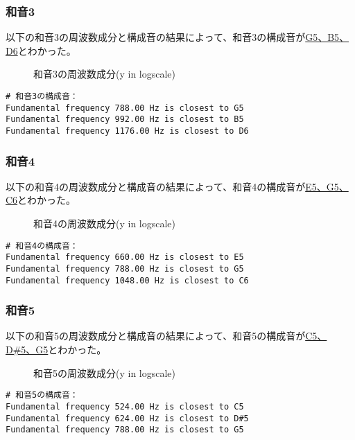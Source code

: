 \documentclass{article}
\begin{document}
\begin{spacing}{1.2}
        \subsubsection*{和音3}
        以下の和音3の周波数成分と構成音の結果によって、和音3の構成音が\underline{G5、B5、D6}とわかった。
        \begin{figure}[ht] %
            \centering
            \caption{和音3の周波数成分(y in logscale)}
        \end{figure}
        \FloatBarrier
        \begin{lstlisting}
# 和音3の構成音：
Fundamental frequency 788.00 Hz is closest to G5
Fundamental frequency 992.00 Hz is closest to B5
Fundamental frequency 1176.00 Hz is closest to D6
        \end{lstlisting}
        \subsubsection*{和音4}
        以下の和音4の周波数成分と構成音の結果によって、和音4の構成音が\underline{E5、G5、C6}とわかった。
        \begin{figure}[ht] %
            \centering
            \caption{和音4の周波数成分(y in logscale)}
        \end{figure}
        \FloatBarrier
        \begin{lstlisting}
# 和音4の構成音：
Fundamental frequency 660.00 Hz is closest to E5
Fundamental frequency 788.00 Hz is closest to G5
Fundamental frequency 1048.00 Hz is closest to C6
        \end{lstlisting}
        \subsubsection*{和音5}
        以下の和音5の周波数成分と構成音の結果によって、和音5の構成音が\underline{C5、D\#5、G5}とわかった。
        \begin{figure}[ht] %
            \centering
            \caption{和音5の周波数成分(y in logscale)}
        \end{figure}
        \FloatBarrier
        \begin{lstlisting}
# 和音5の構成音：
Fundamental frequency 524.00 Hz is closest to C5
Fundamental frequency 624.00 Hz is closest to D#5
Fundamental frequency 788.00 Hz is closest to G5
        \end{lstlisting}

\end{spacing}
\end{document}
